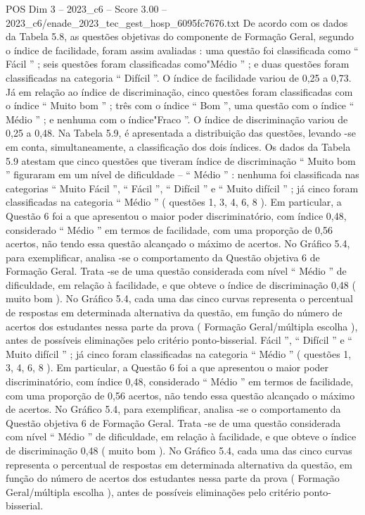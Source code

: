 \begin{textsample}{POS Dim 3 – 2023\_c6 – Score 3.00 – 2023\_c6/enade\_2023\_tec\_gest\_hosp\_6095fc7676.txt}
De acordo com os dados da Tabela 5.8, as questões objetivas do componente de Formação Geral, segundo o índice de facilidade, foram assim avaliadas : uma questão foi classificada como “ Fácil ” ; seis questões foram classificadas como"Médio ” ; e duas questões foram classificadas na categoria “ Difícil ”.
O índice de facilidade variou de 0,25 a 0,73.
Já em relação ao índice de discriminação, cinco questões foram classificadas com o índice “ Muito bom ” ; três com o índice “ Bom ”, uma questão com o índice “ Médio ” ; e nenhuma com o índice"Fraco ”.
O índice de discriminação variou de 0,25 a 0,48.
Na Tabela 5.9, é apresentada a distribuição das questões, levando -se em conta, simultaneamente, a classificação dos dois índices.
Os dados da Tabela 5.9 atestam que cinco questões que tiveram índice de discriminação “ Muito bom ” figuraram em um nível de dificuldade – “ Médio ” : nenhuma foi classificada nas categorias “ Muito Fácil ”, “ Fácil ”, “ Difícil ” e “ Muito difícil ” ; já cinco foram classificadas na categoria “ Médio ” ( questões 1, 3, 4, 6, 8 ).
Em particular, a Questão 6 foi a que apresentou o maior poder discriminatório, com índice 0,48, considerado “ Médio ” em termos de facilidade, com uma proporção de 0,56 acertos, não tendo essa questão alcançado o máximo de acertos.
No Gráfico 5.4, para exemplificar, analisa -se o comportamento da Questão objetiva 6 de Formação Geral.
Trata -se de uma questão considerada com nível “ Médio ” de dificuldade, em relação à facilidade, e que obteve o índice de discriminação 0,48 ( muito bom ).
No Gráfico 5.4, cada uma das cinco curvas representa o percentual de respostas em determinada alternativa da questão, em função do número de acertos dos estudantes nessa parte da prova ( Formação Geral/múltipla escolha ), antes de possíveis eliminações pelo critério ponto-bisserial.
Fácil ”, “ Difícil ” e “ Muito difícil ” ; já cinco foram classificadas na categoria “ Médio ” ( questões 1, 3, 4, 6, 8 ).
Em particular, a Questão 6 foi a que apresentou o maior poder discriminatório, com índice 0,48, considerado “ Médio ” em termos de facilidade, com uma proporção de 0,56 acertos, não tendo essa questão alcançado o máximo de acertos.
No Gráfico 5.4, para exemplificar, analisa -se o comportamento da Questão objetiva 6 de Formação Geral.
Trata -se de uma questão considerada com nível “ Médio ” de dificuldade, em relação à facilidade, e que obteve o índice de discriminação 0,48 ( muito bom ).
No Gráfico 5.4, cada uma das cinco curvas representa o percentual de respostas em determinada alternativa da questão, em função do número de acertos dos estudantes nessa parte da prova ( Formação Geral/múltipla escolha ), antes de possíveis eliminações pelo critério ponto-bisserial.

\end{textsample}
